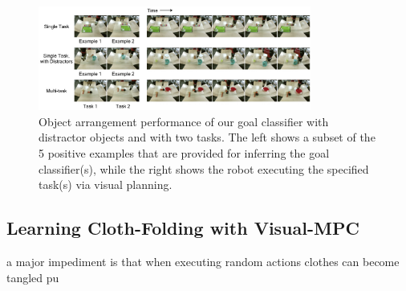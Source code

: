 \begin{figure}
    \centering
    \includegraphics[width=0.8\textwidth]{images_cls/cls_results.jpeg}
    \caption{\small Object arrangement performance of our goal classifier with distractor objects and with two tasks. The left shows a subset of the 5 positive examples that are provided for inferring the goal classifier(s), while the right shows the robot executing the specified task(s) via visual planning.}
    \label{fig:cls_results}
    \vspace{-0.3cm}
\end{figure}

\subsection{Learning Cloth-Folding with Visual-MPC}
\label{subsec:cloth_folding_data}
a major impediment is that when executing random actions clothes can become tangled pu